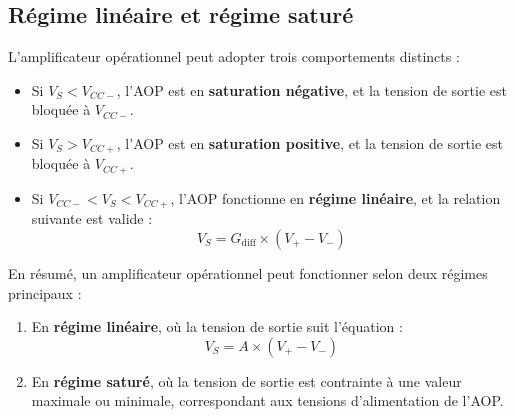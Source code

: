 \subsection{Régime linéaire et régime saturé}

L'amplificateur opérationnel peut adopter trois comportements distincts :

\begin{itemize}
    \item Si \( V_S < V_{CC-} \), l'AOP est en \textbf{saturation négative}, et la tension de sortie est bloquée à \( V_{CC-} \).
    \item Si \( V_S > V_{CC+} \), l'AOP est en \textbf{saturation positive}, et la tension de sortie est bloquée à \( V_{CC+} \).
    \item Si \( V_{CC-} < V_S < V_{CC+} \), l'AOP fonctionne en \textbf{régime linéaire}, et la relation suivante est valide :
    \[
    V_S = G_{\text{diff}} \times (V_+ - V_-)
    \]
\end{itemize}

En résumé, un amplificateur opérationnel peut fonctionner selon deux régimes principaux :

\begin{enumerate}
    \item En \textbf{régime linéaire}, où la tension de sortie suit l'équation :
    \[
    V_S = A \times (V_+ - V_-)
    \]
    \item En \textbf{régime saturé}, où la tension de sortie est contrainte à une valeur maximale ou minimale, correspondant aux tensions d'alimentation de l'AOP.
\end{enumerate}

